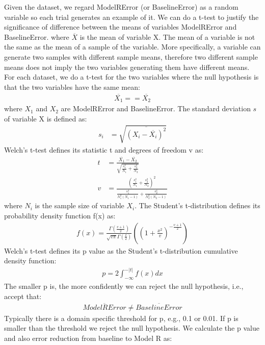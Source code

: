 \documentclass[letterpaper]{article}
\begin{document}
Given the dataset, we regard ModelRError (or BaselineError) as a random variable so each trial generates an example of it.
We can do a t-test to justify the significance of difference between the means of variables ModelRError and BaselineError.
where $ \overline{X} $ is the mean of variable X.
The mean of a variable is not the same as the mean of a sample of the variable.
More specifically,
a variable can generate two samples with different sample means,
therefore two different sample means does not imply the two variables generating them have different means.
For each dataset, we do a t-test for the two variables where the null hypothesis is that the two variables have the same mean:
\begin{align*}
\overline{X_1} == \overline{X_2}
\end{align*}
where $ X_1 $ and $ X_2 $ are ModelRError and BaselineError.
The standard deviation $ s $ of variable X is defined as:
\begin{align*}
	s_i &= \sqrt{\overline{(X_i - \overline{X_i})^2}}
\end{align*}
Welch's t-test defines its statistic t and degrees of freedom v as:
\begin{align*}
	t &= \frac{
		\overline{X_1} - \overline{X_2}
		}{
		\sqrt{\frac{s^2_1}{N_1} + \frac{s^2_2}{N_2}}
		}\\
	v &= \frac{
		(\frac{s^2_1}{N_1} + \frac{s^2_2}{N_2})^2
		}{
		\frac{s^4_1}{N_1^2(N_1-1)} + \frac{s^4_2}{N_2^2(N_2-1)}
		}
\end{align*}
where $ N_i $ is the sample size of variable $ X_i $.
The Student's t-distribution defines its probability density function f(x) as:
\begin{align*}
f(x) = \frac{\Gamma(\frac{v+1}{2})}{\sqrt{v\pi}\Gamma(\frac{v}{2})}
((1+\frac{x^2}{v})^{-\frac{v+1}{2}})
\end{align*}
Welch's t-test defines its p value as the Student's t-distribution cumulative density function:
\begin{align*}
p = 2 \int_{-\infty}^{-|t|} f(x) dx
\end{align*}
The smaller p is, the more confidently we can reject the null hypothesis, i.e., accept that:
\begin{align*}
\overline{ModelRError} \neq \overline{BaselineError}
\end{align*}
Typically there is a domain specific threshold for p, e.g., 0.1 or 0.01. If p is smaller than the threshold we reject the null hypothesis.
We calculate the p value and also error reduction from baseline to Model R as:
\end{document}
